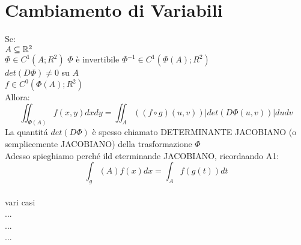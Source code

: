 \section{Cambiamento di Variabili}
Se:\\
$A\subseteq \mathbb{R}^2$\\
$\varPhi\in C^1(A;R^2)$
$\varPhi$ è invertibile
$\varPhi^{-1}\in C^1(\varPhi(A);R^2)$\\
$det(D\varPhi)\ne 0$ su $A$\\
$f\in C^0(\varPhi(A);R^2)$\\
Allora:\\
$$ \iint_{\varPhi(A)}f(x,y)dxdy=\iint_A((f\circ g)(u,v))|det(D\varPhi(u,v))|dudv$$
La quantit\'a $det(D\varPhi)$ è spesso chiamato DETERMINANTE JACOBIANO (o semplicemente JACOBIANO) della trasformazione $\varPhi$\\
Adesso spieghiamo perché ild eterminande JACOBIANO, ricordaando A1:
$$ \int_g(A)f(x)dx = \int_Af(g(t))dt$$\\
vari casi\\
...\\
...\\
...\\



